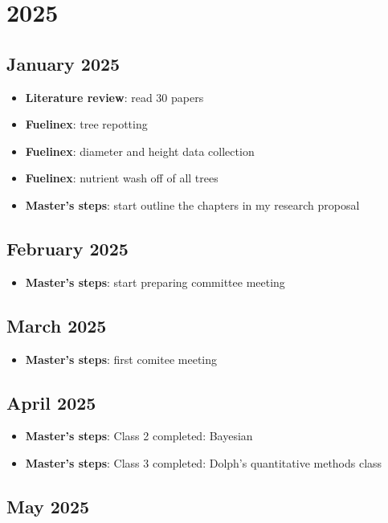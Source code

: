 \documentclass{article}
\begin{document}
\section {2025}
\subsection {January 2025}
\begin {itemize}
	\item \textbf{Literature review}: read 30 papers
	\item \textbf{Fuelinex}: tree repotting
	\item \textbf{Fuelinex}: diameter and height data collection
	\item \textbf{Fuelinex}: nutrient wash off of all trees
	\item \textbf{Master's steps}: start outline the chapters in my research proposal
\end {itemize}

\subsection {February 2025}
\begin {itemize}
	\item \textbf{Master's steps}: start preparing committee meeting
\end {itemize}

\subsection {March 2025}
\begin {itemize}
	\item \textbf{Master's steps}: first comitee meeting
\end {itemize}

\subsection {April 2025}
\begin {itemize}
	\item \textbf{Master's steps}: Class 2 completed: Bayesian
	\item \textbf{Master's steps}: Class 3 completed: Dolph's quantitative methods class
\end {itemize}

\subsection {May 2025}
\begin {itemize}

\end {itemize}
\end{document}
